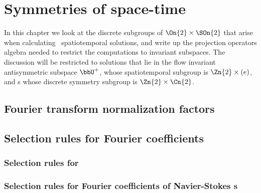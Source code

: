 
\chapter{Symmetries of space-time \KSe}
\label{chap:disc_symm}

In this chapter we look at the discrete subgroups of $\On{2} \times
\SOn{2}$ that arise when calculating \twot\ spatiotemporal solutions, and
write up the projection operators algebra needed to restrict the
computations to invariant subspaces. The discussion will be restricted to
solutions that lie in the flow invariant antisymmetric subspace $\bbU^+$,
whose spatiotemporal subgroup is $\Zn{2}\times (e)$, and \ppo s whose
discrete symmetry subgroup is $\Zn{2} \times \Cn{2}$.

%

\section{Fourier transform normalization factors}
\label{sect:FTnormal}


\section{Selection rules for Fourier coefficients}
\label{sect:selection}

\subsection{Selection rules for \KS}
\label{sect:selectionKS}


\subsection{Selection rules for Fourier coefficients of Navier-Stokes \ppo s}

